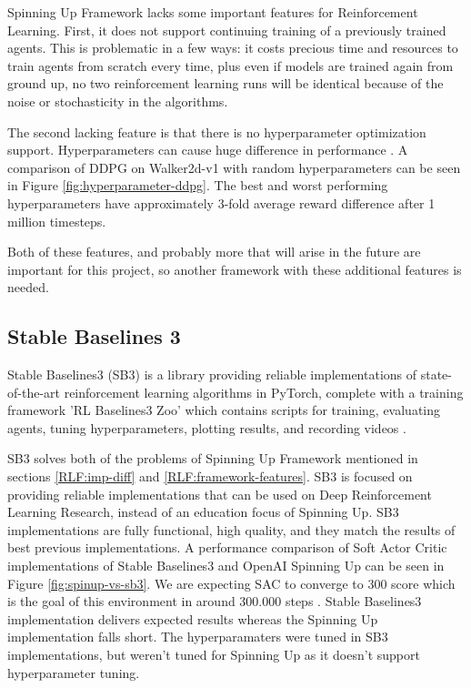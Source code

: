 Spinning Up Framework lacks some important features for Reinforcement Learning. First, it does not support continuing training of a previously trained agents. This is problematic in a few ways: it costs precious time and resources to train agents from scratch every time, plus even if models are trained again from ground up, no two reinforcement learning runs will be identical because of the noise or stochasticity in the algorithms.

The second lacking feature is that there is no hyperparameter optimization support. Hyperparameters can cause huge difference in performance \cite{hyperparameter-ddpg}. A comparison of DDPG on Walker2d-v1 with random hyperparameters can be seen in Figure \ref{fig:hyperparameter-ddpg}. The best and worst performing hyperparameters have approximately 3-fold average reward difference after 1 million timesteps.

Both of these features, and probably more that will arise in the future are important for this project, so another framework with these additional features is needed.


\subsection{Stable Baselines 3}
Stable Baselines3 (SB3) is a library providing reliable implementations of state-of-the-art reinforcement learning algorithms in PyTorch, complete with a training framework 'RL Baselines3 Zoo' which contains scripts for training, evaluating agents, tuning hyperparameters, plotting results, and recording videos \cite{stable-baselines3}.

SB3 solves both of the problems of Spinning Up Framework mentioned in sections \ref{RLF:imp-diff} and \ref{RLF:framework-features}. SB3 is focused on providing reliable implementations that can be used on Deep Reinforcement Learning Research, instead of an education focus of Spinning Up. SB3 implementations are fully functional, high quality, and they match the results of best previous implementations. A performance comparison of Soft Actor Critic implementations of Stable Baselines3 and OpenAI Spinning Up can be seen in Figure \ref{fig:spinup-vs-sb3}. We are expecting SAC to converge to 300 score which is the goal of this environment \cite{Bipedal-Walker-v2} in around 300.000 steps \cite{gym-leaderboard}. Stable Baselines3 implementation delivers expected results whereas the Spinning Up implementation falls short. The hyperparamaters were tuned in SB3 implementations, but weren't tuned for Spinning Up as it doesn't support hyperparameter tuning.

